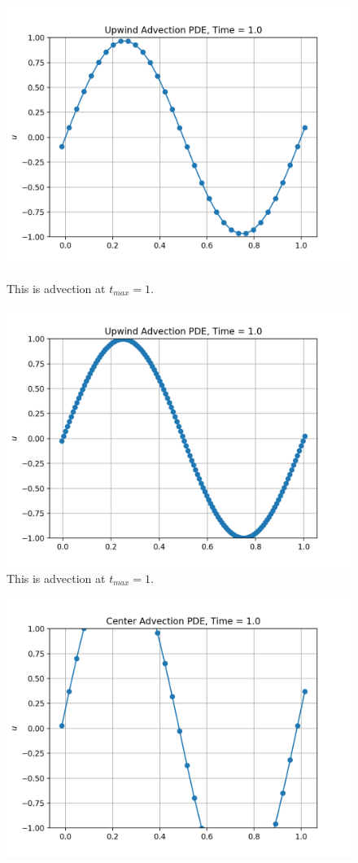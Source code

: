 \documentclass[12pt]{article}
\begin{document}
\begin{enumerate}[label=(\alph*)]
	\begin{figure}[htb]
		\centering
		\begin{minipage}[c]{0.48\textwidth}
			\centering
			\includegraphics[width=0.7\linewidth]{./PDE/figures/advection_32_upwind/result_advection_32_upwind_1.png}
			\caption{This is advection at $t_{max} = 1$.}
			\label{fig:ad1}
		\end{minipage}
		\hspace{0.1in}
		\begin{minipage}[c]{0.48\textwidth}
			\centering
			\includegraphics[width=0.7\linewidth]{./PDE/figures/advection_128_upwind/result_advection_128_upwind_1.png}
			\caption{This is advection at $t_{max} = 1$.}
			\label{fig:ad2}
		\end{minipage}
		\newline
		\vspace{-0.2in}
	\end{figure}
		\begin{figure}[htb]
		\centering
		\begin{minipage}[c]{0.48\textwidth}
			\centering
			\includegraphics[width=0.7\linewidth]{./PDE/figures/advection_32_center/result_advection_32_center_1.png}

\end{minipage}
\end{figure}
\end{enumerate}
\end{document}
